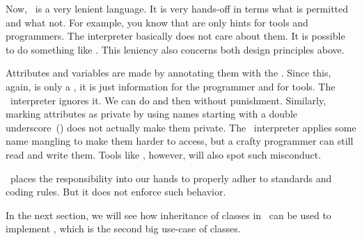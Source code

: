Now, \python\ is a very lenient language.
It is very hands-off in terms what is permitted and what not.
For example, you know that  are only hints for tools and programmers.
The \python interpreter basically does not care about them.
It is possible to do something like .
This leniency also concerns both design principles above.

Attributes and variables are made  by annotating them with the  .
Since this, again, is only a , it is just information for the programmer and for tools.
The \python\ interpreter ignores it.
We can do  and then  without punishment.
Similarly, marking attributes as private by using names starting with a double underscore~(\pythonilIdx{\_\_}) does not actually make them private.
The \python\ interpreter applies some name mangling to make them harder to access, but a crafty programmer can still read and write them.
Tools like \mypy, however, will also spot such misconduct.

\python\ places the responsibility into our hands to properly adher to standards and coding rules.
But it does not enforce such behavior.

In the next section, we will see how inheritance of classes in \python\ can be used to implement , which is the second big use-case of classes.%
\endhsection%
%
\FloatBarrier%
\endhsection%

